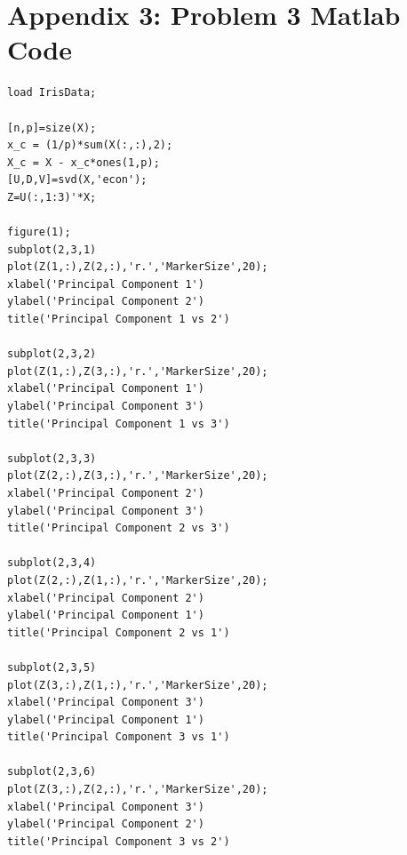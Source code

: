 \documentclass{article}
\begin{document}
\section*{Appendix 3: Problem 3 Matlab Code}
\begin{verbatim}
load IrisData;

[n,p]=size(X);
x_c = (1/p)*sum(X(:,:),2);
X_c = X - x_c*ones(1,p);
[U,D,V]=svd(X,'econ');
Z=U(:,1:3)'*X;

figure(1);
subplot(2,3,1)
plot(Z(1,:),Z(2,:),'r.','MarkerSize',20);
xlabel('Principal Component 1')
ylabel('Principal Component 2')
title('Principal Component 1 vs 2')

subplot(2,3,2)
plot(Z(1,:),Z(3,:),'r.','MarkerSize',20);
xlabel('Principal Component 1')
ylabel('Principal Component 3')
title('Principal Component 1 vs 3')

subplot(2,3,3)
plot(Z(2,:),Z(3,:),'r.','MarkerSize',20);
xlabel('Principal Component 2')
ylabel('Principal Component 3')
title('Principal Component 2 vs 3')

subplot(2,3,4)
plot(Z(2,:),Z(1,:),'r.','MarkerSize',20);
xlabel('Principal Component 2')
ylabel('Principal Component 1')
title('Principal Component 2 vs 1')

subplot(2,3,5)
plot(Z(3,:),Z(1,:),'r.','MarkerSize',20);
xlabel('Principal Component 3')
ylabel('Principal Component 1')
title('Principal Component 3 vs 1')

subplot(2,3,6)
plot(Z(3,:),Z(2,:),'r.','MarkerSize',20);
xlabel('Principal Component 3')
ylabel('Principal Component 2')
title('Principal Component 3 vs 2')
\end{verbatim}
\end{document}
